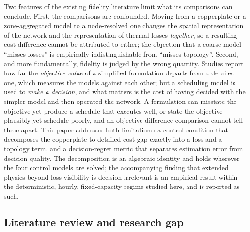 \documentclass[a4paper,fleqn]{cas-sc}
\newcommand{\new}[1]{\textcolor[HTML]{1A5FB4}{#1}}   %
\newcommand{\new}[1]{#1}
\begin{document}
Two features of the existing fidelity literature limit what its comparisons can
conclude. First, the comparisons are confounded. Moving from a copperplate or a
zone-aggregated model to a node-resolved one changes the spatial representation of
the network and the representation of thermal losses \emph{together}, so a resulting
cost difference cannot be attributed to either; the objection that a coarse model
``misses losses'' is empirically indistinguishable from ``misses topology''. Second,
and more fundamentally, fidelity is judged by the wrong quantity. Studies report how
far the \emph{objective value} of a simplified formulation departs from a detailed
one, which measures the models against each other; but a scheduling model is used to
\emph{make a decision}, and what matters is the cost of having decided with the
simpler model and then operated the network. A formulation can misstate the objective
yet produce a schedule that executes well, or state the objective plausibly yet
schedule poorly, and an objective-difference comparison cannot tell these apart.
This paper addresses both limitations: a control condition that decomposes the
copperplate-to-detailed cost gap exactly into a loss and a topology term, and a
decision-regret metric that separates estimation error from decision quality. The
decomposition is an algebraic identity and holds wherever the four control models
are solved; the accompanying finding that extended physics beyond loss visibility
is decision-irrelevant is an empirical result within the deterministic, hourly,
fixed-capacity regime studied here, and is reported as such.

\subsection{Literature review and research gap}
\new{}

\end{document}
